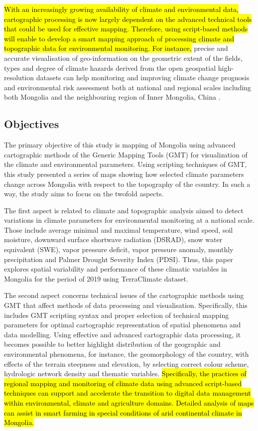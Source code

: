 \documentclass[geosciences,article,submit,pdftex,moreauthors]{Definitions/mdpi}
\begin{document}
\hl{With an increasingly growing availability of climate and environmental data, cartographic processing is now largely dependent on the advanced technical tools that could be used for effective mapping. Therefore, using script-based methods will enable to develop a smart mapping approach of processing climate and topographic data for environmental monitoring. For instance,} precise and accurate visualisation of geo-information on the geometric extent of the fields, types and degree of climate hazards derived from the open geospatial high-resolution datasets can help monitoring and improving climate change prognosis and environmental risk assessment both at national and regional scales including both Mongolia and the neighbouring region of Inner Mongolia, China \cite{JIE2021353,5631071,5964785}. 

\subsection{Objectives}
The primary objective of this study is mapping of Mongolia using advanced cartographic methods of the Generic Mapping Tools (GMT) for visualization of the climate and environmental parameters. Using scripting techniques of GMT, this study presented a series of maps showing how selected climate parameters change across Mongolia with respect to the topography of the country. In such a way, the study aims to focus on the twofold aspects.

The first aspect is related to climate and topographic analysis aimed to detect variations in climate parameters for environmental monitoring at a national scale. Those include average minimal and maximal temperature, wind speed, soil moisture, downward surface shortwave radiation (DSRAD), snow water equivalent (SWE), vapor pressure deficit, vapor pressure anomaly, monthly precipitation and Palmer Drought Severity Index (PDSI). Thus, this paper explores spatial variability and performance of these climatic variables in Mongolia for the period of 2019 using TerraClimate dataset.

The second aspect concerns technical issues of the cartographic methods using GMT that affect methods of data processing and visualisation. Specifically, this includes GMT scripting syntax and proper selection of technical mapping parameters for optimal cartographic representation of spatial phenomena and data modelling. Using effective and advanced cartographic data processing, it becomes possible to better highlight distribution of the geographic and environmental phenomena, for instance, the geomorphology of the country, with effects of the terrain steepness and elevation, by selecting correct colour scheme, hydrologic network density and thematic variables. \hl{Specifically, the practices of regional mapping and monitoring of climate data using advanced script-based techniques can support and accelerate the transition to digital data management within environmental, climate and agriculture domains. Detailed analysis of maps can assist in smart farming in special conditions of arid continental climate in Mongolia.}
\end{document}
